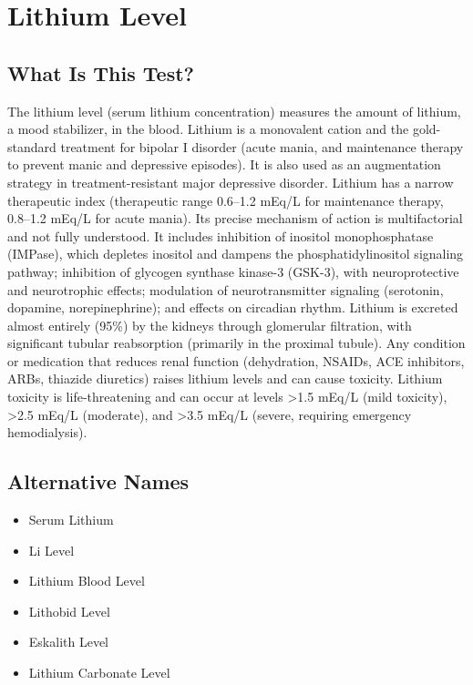 \chapter{Lithium Level}

\section*{What Is This Test?}
The lithium level (serum lithium concentration) measures the amount of lithium, a mood stabilizer, in the blood. Lithium is a monovalent cation and the gold-standard treatment for bipolar I disorder (acute mania, and maintenance therapy to prevent manic and depressive episodes). It is also used as an augmentation strategy in treatment-resistant major depressive disorder. Lithium has a narrow therapeutic index (therapeutic range 0.6--1.2 mEq/L for maintenance therapy, 0.8--1.2 mEq/L for acute mania). Its precise mechanism of action is multifactorial and not fully understood. It includes inhibition of inositol monophosphatase (IMPase), which depletes inositol and dampens the phosphatidylinositol signaling pathway; inhibition of glycogen synthase kinase-3 (GSK-3), with neuroprotective and neurotrophic effects; modulation of neurotransmitter signaling (serotonin, dopamine, norepinephrine); and effects on circadian rhythm. Lithium is excreted almost entirely (95\%) by the kidneys through glomerular filtration, with significant tubular reabsorption (primarily in the proximal tubule). Any condition or medication that reduces renal function (dehydration, NSAIDs, ACE inhibitors, ARBs, thiazide diuretics) raises lithium levels and can cause toxicity. Lithium toxicity is life-threatening and can occur at levels >1.5 mEq/L (mild toxicity), >2.5 mEq/L (moderate), and >3.5 mEq/L (severe, requiring emergency hemodialysis).

\section*{Alternative Names}
\begin{itemize}
  \item Serum Lithium
  \item Li Level
  \item Lithium Blood Level
  \item Lithobid Level
  \item Eskalith Level
  \item Lithium Carbonate Level
\end{itemize}
